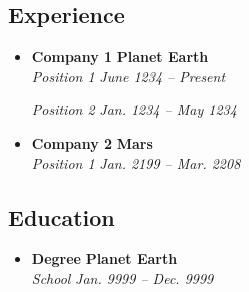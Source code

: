 



\subsection*{Experience}

\begin{itemize}
  \parskip=0.1em

  \item
  \headerrow
    {\textbf{Company 1}}
    {\textbf{Planet Earth}}
  \\
  \headerrow
    {\emph{Position 1}}
    {\emph{June 1234 -- Present}}
  \headerrow
    {\emph{Position 2}}
    {\emph{Jan. 1234 -- May 1234}}

  \item
  \headerrow
    {\textbf{Company 2}}
    {\textbf{Mars}}
  \\
  \headerrow
    {\emph{Position 1}}
    {\emph{Jan. 2199 -- Mar. 2208}}

\end{itemize}

\subsection*{Education}

\begin{itemize}
  \parskip=0.1em

  \item
  \headerrow
    {\textbf{Degree}}
    {\textbf{Planet Earth}}
  \\
  \headerrow
    {\emph{School}}
    {\emph{Jan. 9999 -- Dec. 9999}}

\end{itemize}

